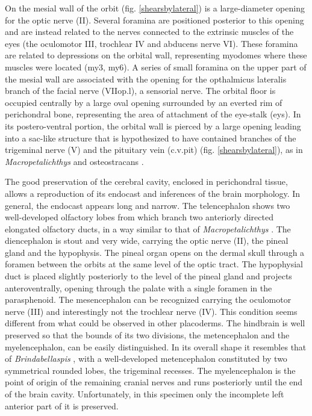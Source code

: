 \documentclass[11pt,letterpaper]{report}
\begin{document}
On the mesial wall of the orbit (fig. \ref{shearsbylateral}) is a large-diameter opening for the optic nerve (II). Several foramina are positioned posterior to this opening and are instead related to the nerves connected to the extrinsic muscles of the eyes (the oculomotor III, trochlear IV and abducens nerve VI). These foramina are related to depressions on the orbital wall, representing myodomes where these muscles were located (my3, my6). A series of small foramina on the upper part of the mesial wall are associated with the opening for the opthalmicus lateralis branch of the facial nerve (VIIop.l), a sensorial nerve. The orbital floor is occupied centrally by a large oval opening surrounded by an everted rim of perichondral bone, representing the area of attachment of the eye-stalk (eys). In its postero-ventral portion, the orbital wall is pierced by a large opening leading into a sac-like structure that is hypothesized to have contained branches of the trigeminal nerve (V) and the pituitary vein (c.v.pit) (fig. \ref{shearsbylateral}), as in \textit{Macropetalichthys} \citep{Stensi1969} and osteostracans \citep{Janvier1985,Janvier1996}.

The good preservation of the cerebral cavity, enclosed in perichondral tissue, allows a reproduction of its endocast and inferences of the brain morphology. In general, the endocast appears long and narrow. The telencephalon shows two well-developed olfactory lobes from which branch two anteriorly directed elongated olfactory ducts, in a way similar to that of \textit{Macropetalichthys} \citep{Stensi1925,Stensi1963a,Stensi1969}. The diencephalon is stout and very wide, carrying the optic nerve (II), the pineal gland and the hypophysis. The pineal organ opens on the dermal skull through a foramen between the orbits at the same level of the optic tract. The hypophysial duct is placed slightly posteriorly to the level of the pineal gland and projects anteroventrally, opening through the palate with a single foramen in the parasphenoid. The mesencephalon can be recognized carrying the oculomotor nerve (III) and interestingly not the trochlear nerve (IV). This condition seems different from what could be observed in other placoderms. The hindbrain is well preserved so that the bounds of its two divisions, the metencephalon and the myelencephalon, can be easily distinguished. In its overall shape it resembles that of \textit{Brindabellaspis} \citep{Young1980}, with a well-developed metencephalon constituted by two symmetrical rounded lobes, the trigeminal recesses. The myelencephalon is the point of origin of the remaining cranial nerves and runs posteriorly until the end of the brain cavity. Unfortunately, in this specimen only the incomplete left anterior part of it is preserved.
\end{document}

